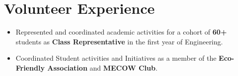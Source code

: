 \documentclass[a4paper,20pt]{article}
\begin{document}
\vspace{+5pt}
\section{Volunteer Experience}
\begin{itemize}
    \item {Represented and coordinated academic activities for a cohort of \textbf{60+} students as \textbf{Class Representative} in the first year of Engineering.}
    \item {Coordinated Student activities and Initiatives as a member of the \textbf{Eco-Friendly Association} and \textbf{MECOW Club}.}
    \end{itemize}
\end{document}
